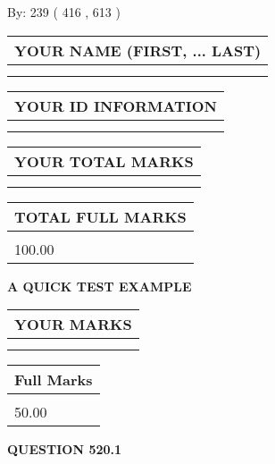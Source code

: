 \documentclass[12pt]{article}
\begin{document}
   
\hspace{1.0in} By: 
 239 ( 416 ,  613 )
   
   
   
   
\newpage 
\setcounter{page}{ 
   520001 } 
   
   
   
   
\noindent\begin{tabular}{|l|}
\hline
YOUR NAME (FIRST, ... LAST)  \\
\hline
 \\ 
 \\ 
\hline
\end{tabular}
\hspace{0.05in} \begin{tabular}{|l|}
\hline
 YOUR   ID   INFORMATION  \\
\hline
 \\ 
 \\ 
\hline
\end{tabular}
   
   
\vspace{0.2in}\noindent\begin{tabular}{|l|}
\hline
YOUR TOTAL MARKS  \\
\hline
 \\ 
 \\ 
\hline
\end{tabular}
\hspace{0.05in} \begin{tabular}{|l|}
\hline
TOTAL FULL MARKS  \\
\hline
 \\ 
100.00 \\
\hline
\end{tabular}
   
   
 \vspace{0.2in}
{\LARGE {\textbf{ A QUICK TEST EXAMPLE}}}
   
   
  
\vspace{0.2in}
  
\noindent\begin{tabular}{|l|}
\hline
 YOUR MARKS  \\
\hline
 \\ 
 \\ 
\hline
\end{tabular}
\hspace{0.05in} \begin{tabular}{|l|}
\hline
 Full Marks  \\
\hline
 \\ 
50.00 \\
\hline
\end{tabular}
{\textbf{\Large{QUESTION
520.1 
}}}
  
\end{document}
